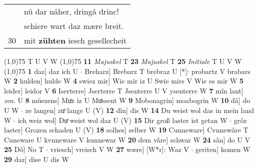 \documentclass[8pt,a4paper,notitlepage]{article}
\begin{document}
\begin{table}[ht]
\begin{minipage}[t]{0.5\linewidth}
\begin{tabular}{rl}
 & nû dar nâher, dringâ drinc!\\ 
 & schiere wart daz mære breit.\\ 
30 & mit \textbf{zühten} iesch gesellecheit\\ 
\end{tabular}
\scriptsize
\line(1,0){75} \newline
T U V W \newline
\line(1,0){75} \newline
\textbf{11} \textit{Majuskel} T  \textbf{23} \textit{Majuskel} T  \textbf{25} \textit{Initiale} T U V W  \newline
\line(1,0){75} \newline
\textbf{1} daz] daz ich U  $\cdot$ Breharz] Brebarz T brebraz U [*]: probartz V brabars W \textbf{2} hulden] hulde W \textbf{4} swiez mir] Wie mir iz U Swie mirs V Wie es mir W \textbf{5} leider] leidor V \textbf{6} Iserterre] Jserterre T Jsenterre U V ysenterre W \textbf{7} mîn lant] \textit{om.} U \textbf{8} müezens] Muͦz iz U Muͤssent W \textbf{9} Mobonagrin] moabogrin W \textbf{10} dâ] do U W  $\cdot$ ze langen] zuͦ lange U (V) \textbf{12} dîn] dis W \textbf{14} Du weist wol das in mein land W  $\cdot$ ich weiz wol] Duͦ weist wol daz U (V) \textbf{15} Dir groß laster ist getan W  $\cdot$ grôz laster] Grozen schaden U (V) \textbf{18} solhes] selber W \textbf{19} Cunneware] Cvnnewâre T Cuneware U kvnneware V kunnewar W \textbf{20} dem vâre] schwar W \textbf{24} sân] do U V \textbf{25} Dô] No T  $\cdot$ vriesch] vreisch V W \textbf{27} wære] [W*r]: Waz V  $\cdot$ geriten] komen W \textbf{29} daz] dise U dis W \newline
\end{minipage}
\end{table}
\end{document}
